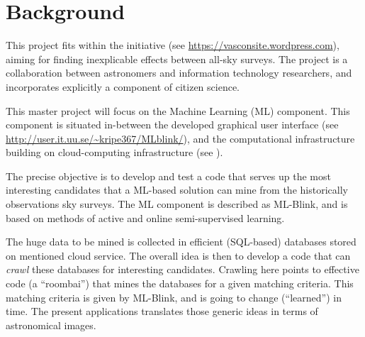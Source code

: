 \section{Background}

This project fits within the \vasco initiative (see \url{https://vasconsite.wordpress.com}), aiming for finding inexplicable effects between all-sky surveys. The \vasco project is a collaboration between astronomers and information technology researchers, and incorporates explicitly a component of citizen science.

This master project will focus on the Machine Learning (ML) component. This component is situated in-between the developed graphical user interface (see \url{http://user.it.uu.se/~kripe367/MLblink/}), and the computational infrastructure building on cloud-computing infrastructure (see ).

The precise objective is to develop and test a code that serves up the most interesting candidates that a ML-based solution can mine from the historically observations sky surveys. The ML component is described as ML-Blink, and is based on methods of active and online semi-supervised learning.

The huge data to be mined is collected in efficient (SQL-based) databases stored on mentioned cloud service. The overall idea is then to develop a code that can {\em crawl} these databases for interesting candidates. Crawling here points to effective code (a ``roombai'') that mines the databases for a given matching criteria. This matching criteria is given by ML-Blink, and is going to change (``learned'') in time. The present applications translates those generic ideas in terms of astronomical images.